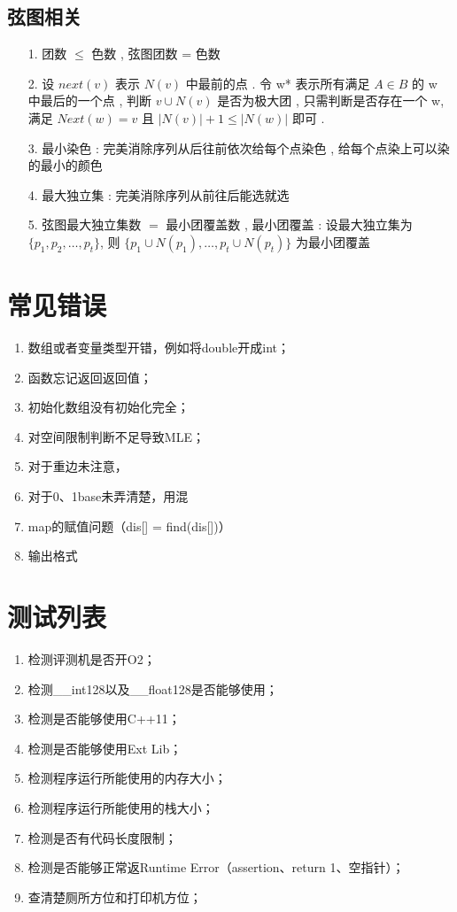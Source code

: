 \documentclass[a4paper]{ctexart}
\begin{document}
\subsection{弦图相关}
\begin{enumerate}
	\item[1.] 团数 $\leq$ 色数 , 弦图团数 = 色数
	\item[2.] 设 $next(v)$ 表示 $N(v)$ 中最前的点 . 
	令 w* 表示所有满足 $A \in B$ 的 w 中最后的一个点 , 
	判断 $v \cup N(v)$ 是否为极大团 , 
	只需判断是否存在一个 w, 
	满足 $Next(w)=v$ 且 $|N(v)| + 1 \leq |N(w)|$ 即可 . 
	\item[3.] 最小染色 : 完美消除序列从后往前依次给每个点染色 , 
	给每个点染上可以染的最小的颜色
	\item[4.] 最大独立集 : 完美消除序列从前往后能选就选
	\item[5.] 弦图最大独立集数 $=$ 最小团覆盖数 , 
	最小团覆盖 : 
	设最大独立集为 $\{p_1,p_2, \dots ,p_t\}$, 
	则 $\{p_1\cup N(p_1), \dots , p_t \cup N(p_t)\}$ 
	为最小团覆盖
\end{enumerate}


\section{常见错误}

\begin{spacing}{0.6}
	\begin{enumerate}
		\item 数组或者变量类型开错，例如将double开成int；
		\item 函数忘记返回返回值；
		\item 初始化数组没有初始化完全；
		\item 对空间限制判断不足导致MLE；
		\item 对于重边未注意，
		\item 对于0、1base未弄清楚，用混
		\item map的赋值问题（dis[] = find(dis[])）
		\item 输出格式
	\end{enumerate}
\end{spacing}

\section{测试列表}
\begin{spacing}{0.6}
	\begin{enumerate}
		\item 检测评测机是否开O2；
		\item 检测\_\_int128以及\_\_float128是否能够使用；
		\item 检测是否能够使用C++11；
		\item 检测是否能够使用Ext Lib；
		\item 检测程序运行所能使用的内存大小；
		\item 检测程序运行所能使用的栈大小；
		\item 检测是否有代码长度限制；
		\item 检测是否能够正常返Runtime Error（assertion、return 1、空指针）；
		\item 查清楚厕所方位和打印机方位；
	\end{enumerate}
\end{spacing}
\end{document}
